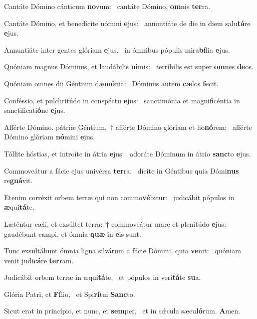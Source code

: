 \item Cantáte Dómino cánticum \textbf{no}vum:~\psstar{} cantáte Dómino, \textbf{om}nis \textbf{ter}ra.
\item Cantáte Dómino, et benedícite nómini \textbf{e}jus:~\psstar{} annuntiáte de die in diem salu\textbf{tá}re \textbf{e}jus.
\item Annuntiáte inter gentes glóriam \textbf{e}jus,~\psstar{} in ómnibus pópulis mira\textbf{bí}lia \textbf{e}jus.
\item Quóniam magnus Dóminus, et laudábilis \textbf{ni}mis:~\psstar{} terríbilis est super \textbf{om}nes \textbf{de}os.
\item Quóniam omnes dii Géntium dæ\textbf{mó}nia:~\psstar{} Dóminus autem \textbf{cæ}los \textbf{fe}cit.
\item Conféssio, et pulchritúdo in conspéctu \textbf{e}jus:~\psstar{} sanctimónia et magnificéntia in sanctificati\textbf{ó}ne \textbf{e}jus.
\item Afférte Dómino, pátriæ Géntium,~† afférte Dómino glóriam et ho\textbf{nó}rem:~\psstar{} afférte Dómino glóriam \textbf{nó}mini \textbf{e}jus.
\item Tóllite hóstias, et introíte in átria \textbf{e}jus:~\psstar{} adoráte Dóminum in átrio \textbf{sanc}to \textbf{e}jus.
\item Commoveátur a fácie ejus univérsa \textbf{ter}ra:~\psstar{} dícite in Géntibus quia Dómi\textbf{nus} re\textbf{gná}vit.
\item Etenim corréxit orbem terræ qui non commo\textbf{vé}bitur:~\psstar{} judicábit pópulos in \textbf{æ}qui\textbf{tá}te.
\item Læténtur cæli, et exsúltet terra:~† commoveátur mare et plenitúdo \textbf{e}jus:~\psstar{} gaudébunt campi, et ómnia \textbf{quæ} in \textbf{e}is sunt.
\item Tunc exsultábunt ómnia ligna silvárum a fácie Dómini, quia \textbf{ve}nit:~\psstar{} quóniam venit judi\textbf{cá}re \textbf{ter}ram.
\item Judicábit orbem terræ in æqui\textbf{tá}te,~\psstar{} et pópulos in veri\textbf{tá}te \textbf{su}a.
\item Glória Patri, et \textbf{Fí}lio,~\psstar{} et Spi\textbf{rí}tui \textbf{Sanc}to.
\item Sicut erat in princípio, et nunc, et \textbf{sem}per,~\psstar{} et in sǽcula sæcu\textbf{ló}rum. \textbf{A}men.
